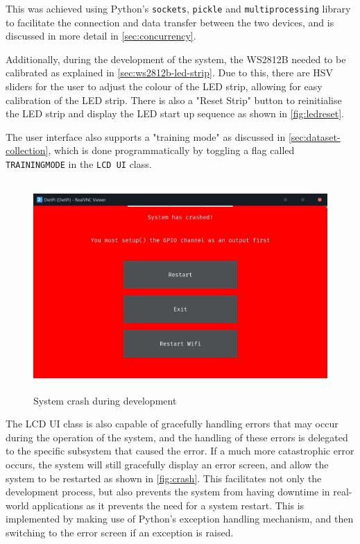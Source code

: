 This was achieved using Python's \texttt{sockets}, \texttt{pickle} and \texttt{multiprocessing} library to facilitate the connection and data transfer between the two devices, and is discussed in more detail in \autoref{sec:concurrency}.

Additionally, during the development of the system, the WS2812B needed to be calibrated as explained in \autoref{sec:ws2812b-led-strip}. Due to this, there are HSV sliders for the user to adjust the colour of the LED strip, allowing for easy calibration of the LED strip. There is also a "Reset Strip" button to reinitialise the LED strip and display the LED start up sequence as shown in \autoref{fig:ledreset}.

The user interface also supports a "training mode" as discussed in \autoref{sec:dataset-collection}, which is done programmatically by toggling a flag called \texttt{TRAININGMODE} in the \texttt{LCD UI} class.
\begin{figure}[H]
    \hfill
    \begin{minipage}[t]{\textwidth}
      \centering
      \includegraphics[height=8cm]{imgs/python/systemcrash.jpg}
      \caption{System crash during development}
      \label{fig:crash}
    \end{minipage}
\end{figure}

The LCD UI class is also capable of gracefully handling errors that may occur during the operation of the system, and the handling of these errors is delegated to the specific subsystem that caused the error. If a much more catastrophic error occurs, the system will still gracefully display an error screen, and allow the system to be restarted as shown in \autoref{fig:crash}. This facilitates not only the development process, but also prevents the system from having downtime in real-world applications as it prevents the need for a system restart. This is implemented by making use of Python's exception handling mechanism, and then switching to the error screen if an exception is raised.

